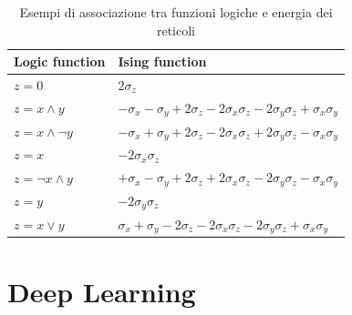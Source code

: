 \documentclass[Lau, noexaminfo, oneside]{sapthesis} %
\begin{document}
\begin{table}[H]
\begin{tabular}{l|l}
Logic function & Ising function\\
\hline
$z = 0$        & 2$\sigma_z$                                                                                   \\
$z = x \wedge y$    & $-\sigma_x - \sigma_y + 2\sigma_z - 2\sigma_x\sigma_z - 2\sigma_y\sigma_z + \sigma_x\sigma_y$ \\
$z = x \wedge \lnot y$   & $-\sigma_x + \sigma_y + 2\sigma_z - 2\sigma_x\sigma_z + 2\sigma_y\sigma_z - \sigma_x\sigma_y$ \\
$z = x$        & $-2\sigma_x\sigma_z$                                                                          \\
$z = \lnot x \wedge y$   & $+\sigma_x - \sigma_y + 2\sigma_z + 2\sigma_x\sigma_z - 2\sigma_y\sigma_z - \sigma_x\sigma_y$ \\
$ z = y$       & $-2\sigma_y\sigma_z$                                                                           \\
$z = x \vee y $   & $\sigma_x + \sigma_y - 2\sigma_z - 2\sigma_x\sigma_z - 2\sigma_y\sigma_z + \sigma_x\sigma_y$  \\

\end{tabular}
\centering
\caption{Esempi di associazione tra funzioni logiche e energia dei reticoli \cite{quantumannealing}}
\end{table}
\chapter{Deep Learning}
\end{document}
